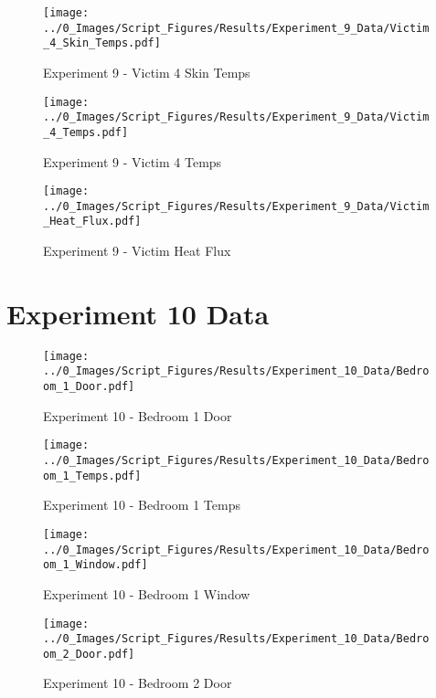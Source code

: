 	\clearpage

	\begin{figure}[H]
		\centering
		\texttt{[image: ../0\_Images/Script\_Figures/Results/Experiment\_9\_Data/Victim\_4\_Skin\_Temps.pdf]}
		\caption[]{Experiment 9 - Victim 4 Skin Temps}
	\end{figure}
 

	\begin{figure}[H]
		\centering
		\texttt{[image: ../0\_Images/Script\_Figures/Results/Experiment\_9\_Data/Victim\_4\_Temps.pdf]}
		\caption[]{Experiment 9 - Victim 4 Temps}
	\end{figure}
 
	\clearpage

	\begin{figure}[H]
		\centering
		\texttt{[image: ../0\_Images/Script\_Figures/Results/Experiment\_9\_Data/Victim\_Heat\_Flux.pdf]}
		\caption[]{Experiment 9 - Victim Heat Flux}
	\end{figure}
 

\clearpage		\large
\section{Experiment 10 Data} \label{App:Exp10Results} 

	\begin{figure}[H]
		\centering
		\texttt{[image: ../0\_Images/Script\_Figures/Results/Experiment\_10\_Data/Bedroom\_1\_Door.pdf]}
		\caption[]{Experiment 10 - Bedroom 1 Door}
	\end{figure}
 

	\begin{figure}[H]
		\centering
		\texttt{[image: ../0\_Images/Script\_Figures/Results/Experiment\_10\_Data/Bedroom\_1\_Temps.pdf]}
		\caption[]{Experiment 10 - Bedroom 1 Temps}
	\end{figure}
 
	\clearpage

	\begin{figure}[H]
		\centering
		\texttt{[image: ../0\_Images/Script\_Figures/Results/Experiment\_10\_Data/Bedroom\_1\_Window.pdf]}
		\caption[]{Experiment 10 - Bedroom 1 Window}
	\end{figure}
 

	\begin{figure}[H]
		\centering
		\texttt{[image: ../0\_Images/Script\_Figures/Results/Experiment\_10\_Data/Bedroom\_2\_Door.pdf]}
		\caption[]{Experiment 10 - Bedroom 2 Door}
	\end{figure}
 
